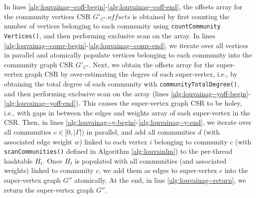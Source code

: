 In lines \ref{alg:louvainag--coff-begin}-\ref{alg:louvainag--coff-end}, the offsets array for the community vertices CSR $G'_{C'}.offsets$ is obtained by first counting the number of vertices belonging to each community using \texttt{countCommunity} \texttt{Vertices()}, and then performing exclusive scan on the array. In lines \ref{alg:louvainag--comv-begin}-\ref{alg:louvainag--comv-end}, we iterate over all vertices in parallel and atomically populate vertices belonging to each community into the community graph CSR $G'_{C'}$. Next, we obtain the offsets array for the super-vertex graph CSR by over-estimating the degree of each super-vertex, i.e., by obtaining the total degree of each community with \texttt{communityTotalDegree()}, and then performing exclusive scan on the array (lines \ref{alg:louvainag--yoff-begin}-\ref{alg:louvainag--yoff-end}). This causes the super-vertex graph CSR to be holey, i.e., with gaps in between the edges and weights array of each super-vertex in the CSR. Then, in lines \ref{alg:louvainag--y-begin}-\ref{alg:louvainag--y-end}, we iterate over all communities $c \in [0, |\Gamma|)$ in parallel, and add all communities $d$ (with associated edge weight $w$) linked to each vertex $i$ belonging to community $c$ (with \texttt{scanCommunities()} defined in Algorithm \ref{alg:louvainlm}) to the per-thread hashtable $H_t$. Once $H_t$ is populated with all communities (and associated weights) linked to community $c$, we add them as edges to super-vertex $c$ into the super-vertex graph $G''$ atomically. At the end, in line \ref{alg:louvainag--return}, we return the super-vertex graph $G''$.



